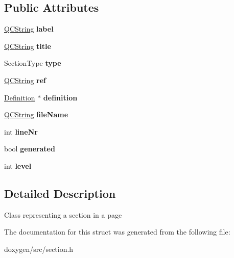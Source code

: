 \subsection*{Public Attributes}
\begin{DoxyCompactItemize}
\item 
\mbox{\label{struct_section_info_a3f1540ed748f49b622915063e97a0a9c}} 
\mbox{\hyperlink{class_q_c_string}{Q\+C\+String}} {\bfseries label}
\item 
\mbox{\label{struct_section_info_a6351881d52095f7bbe11e96a7102f9a6}} 
\mbox{\hyperlink{class_q_c_string}{Q\+C\+String}} {\bfseries title}
\item 
\mbox{\label{struct_section_info_a028667b2061a4cfa8a5ed9765e0583d2}} 
Section\+Type {\bfseries type}
\item 
\mbox{\label{struct_section_info_ad0f4c1f86263d2a044d2b5a183bb3387}} 
\mbox{\hyperlink{class_q_c_string}{Q\+C\+String}} {\bfseries ref}
\item 
\mbox{\label{struct_section_info_aae5dcda2890356ecfcb2cd21f12c2ef7}} 
\mbox{\hyperlink{class_definition}{Definition}} $\ast$ {\bfseries definition}
\item 
\mbox{\label{struct_section_info_a8973ffe375fd2b350a04f51f0785fd58}} 
\mbox{\hyperlink{class_q_c_string}{Q\+C\+String}} {\bfseries file\+Name}
\item 
\mbox{\label{struct_section_info_ae57cb5b4a832c3768cf3f59fc1469846}} 
int {\bfseries line\+Nr}
\item 
\mbox{\label{struct_section_info_a6f1606b8414caf31008f55d8b33d4fcc}} 
bool {\bfseries generated}
\item 
\mbox{\label{struct_section_info_ac215add41d774d87dfd6a56acb4570c5}} 
int {\bfseries level}
\end{DoxyCompactItemize}


\subsection{Detailed Description}
Class representing a section in a page 

The documentation for this struct was generated from the following file\+:\begin{DoxyCompactItemize}
\item 
doxygen/src/section.\+h\end{DoxyCompactItemize}
